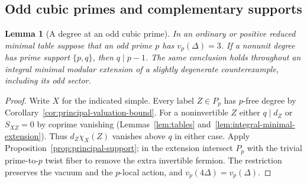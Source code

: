 \documentclass[11pt,a4paper]{article}
\numberwithin{equation}{section}
\newtheorem{lemma}[theorem]{Lemma}
\theoremstyle{remark}
\begin{document}
\subsection{Odd cubic primes and complementary supports}\label{fam:M:sec:10.1}
\begin{lemma}[A degree at an odd cubic prime]\label{fam:M:10.1}\label{lem:cubic-support}
In an ordinary or positive reduced minimal table suppose that an odd
prime $p$ has $v_p(\Delta)=3$. If a nonunit degree has prime support
$\{p,q\}$, then $q\mid p-1$. The same conclusion holds throughout an
integral minimal modular extension of a slightly degenerate
counterexample, including its odd sector.
\end{lemma}
\begin{proof}
Write $X$ for the indicated simple. Every label $Z\in P_p$ has
$p$-free degree by Corollary~\ref{cor:principal-valuation-bound}.
For a noninvertible $Z$ either $q\mid d_Z$ or
$S_{XZ}=0$ by coprime vanishing
(Lemmas~\ref{lem:tables} and~\ref{lem:integral-minimal-extension}).
Thus $d_Z\chi_X(Z)$ vanishes above $q$ in either case. Apply
Proposition~\ref{prop:principal-support}; in the extension intersect
$P_p$ with the trivial prime-to-$p$ twist fiber to remove the extra
invertible fermion. The restriction preserves the vacuum and the
$p$-local action, and $v_p(4\Delta)=v_p(\Delta)$.
\end{proof}
\end{document}
